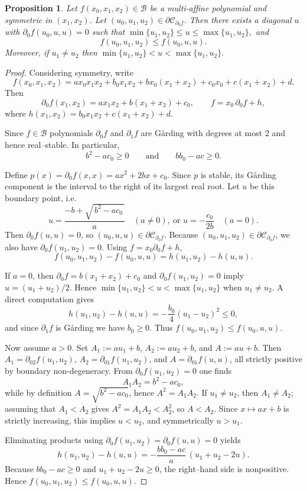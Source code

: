 \documentclass[10pt,a4paper]{amsart}
\providecommand{\propositionname}{Proposition}
\numberwithin{equation}{section}
\numberwithin{figure}{section}
\theoremstyle{plain}
\theoremstyle{remark}
\theoremstyle{definition}
\theoremstyle{plain}
\theoremstyle{definition}
\theoremstyle{plain}
\theoremstyle{plain}
\newtheorem{prop}[thm]{\protect\propositionname}
\theoremstyle{plain}
\providecommand{\propositionname}{Proposition}
\providecommand{\propositionname}{Proposition}
\begin{document}
\setcounter{section}{8}
\setcounter{thm}{9}
\begin{prop}
\label{prop:n=00003D2}Let $f(x_{0},x_{1},x_{2})\in\mathcal{B}$ be
a multi-affine polynomial and symmetric in $(x_{1},x_{2})$. Let $(u_{0},u_{1},u_{2})\in\partial\mathcal{C}_{\partial_{0}f}$.
Then there exists a diagonal $u$ with $\partial_{0}f(u_{0},u,u)=0$
such that $\min\{u_{1},u_{2}\}\le u\le\max\{u_{1},u_{2}\},$ and 
\[
f(u_{0},u_{1},u_{2})\le f(u_{0},u,u).
\]
Moreover, if $u_{1}\neq u_{2}$ then $\min\{u_{1},u_{2}\}<u<\max\{u_{1},u_{2}\}.$
\end{prop}

\begin{proof}
Considering symmetry, write
\[
f(x_{0},x_{1},x_{2})=ax_{0}x_{1}x_{2}+b_{0}x_{1}x_{2}+bx_{0}(x_{1}+x_{2})+c_{0}x_{0}+c(x_{1}+x_{2})+d.
\]
Then 
\[
\partial_{0}f(x_{1},x_{2})=ax_{1}x_{2}+b(x_{1}+x_{2})+c_{0},\qquad f=x_{0}\,\partial_{0}f+h,
\]
where $h(x_{1},x_{2})=b_{0}x_{1}x_{2}+c(x_{1}+x_{2})+d$.

Since $f\in\mathcal{B}$ polynomials $\partial_{0}f$ and $\partial_{1}f$
are G\aa rding with degrees at most 2 and hence real--stable. In
particular, 
\[
b^{2}-ac_{0}\ge0\qquad\text{and}\qquad bb_{0}-ac\ge0.
\]

Define $p(x)=\partial_{0}f(x,x)=ax^{2}+2bx+c_{0}$. Since $p$ is
stable, its G\aa rding component is the interval to the right of
its largest real root. Let $u$ be this boundary point, i.e. 
\[
u=\frac{-b+\sqrt{\,b^{2}-ac_{0}\,}}{a}\quad(a\ne0),\ \text{or }u=-\frac{c_{0}}{2b}\quad(a=0).
\]
Then $\partial_{0}f(u,u)=0$, so $(u_{0},u,u)\in\partial\mathcal{C}_{\partial_{0}f}$.
Because $(u_{0},u_{1},u_{2})\in\partial\mathcal{C}_{\partial_{0}f}$,
we also have $\partial_{0}f(u_{1},u_{2})=0$. Using $f=x_{0}\partial_{0}f+h$,
\[
f(u_{0},u_{1},u_{2})-f(u_{0},u,u)=h(u_{1},u_{2})-h(u,u).
\]

If $a=0$, then $\partial_{0}f=b(x_{1}+x_{2})+c_{0}$ and $\partial_{0}f(u_{1},u_{2})=0$
imply  $u=(u_{1}+u_{2})/2$. Hence $\min\{u_{1},u_{2}\}<u<\max\{u_{1},u_{2}\}$
when $u_{1}\ne u_{2}$. A direct computation gives 
\[
h(u_{1},u_{2})-h(u,u)=-\frac{b_{0}}{4}(u_{1}-u_{2})^{2}\le0,
\]
and since $\partial_{1}f$ is G\aa rding we have $b_{0}\ge0$. Thus
$f(u_{0},u_{1},u_{2})\le f(u_{0},u,u)$.

Now assume $a>0$. Set $A_{1}:=au_{1}+b$, $A_{2}:=au_{2}+b$, and
$A:=au+b$. Then $A_{1}=\partial_{02}f(u_{1},u_{2})$, $A_{2}=\partial_{01}f(u_{1},u_{2})$,
and $A=\partial_{01}f(u,u)$, all strictly positive by boundary non-degeneracy.
From $\partial_{0}f(u_{1},u_{2})=0$ one finds 
\[
A_{1}A_{2}=b^{2}-ac_{0},
\]
while by definition $A=\sqrt{b^{2}-ac_{0}}$, hence $A^{2}=A_{1}A_{2}$.
If $u_{1}\ne u_{2}$, then $A_{1}\ne A_{2}$; assuming that $A_{1}<A_{2}$
gives $A^{2}=A_{1}A_{2}<A_{2}^{2}$, so $A<A_{2}$. Since $x\mapsto ax+b$
is strictly increasing, this implies $u<u_{2}$, and symmetrically
$u>u_{1}$.

Eliminating products using $\partial_{0}f(u_{1},u_{2})=\partial_{0}f(u,u)=0$
yields 
\[
h(u_{1},u_{2})-h(u,u)=-\frac{bb_{0}-ac}{a}\,(u_{1}+u_{2}-2u).
\]
Because $bb_{0}-ac\ge0$ and $u_{1}+u_{2}-2u\ge0$, the right--hand
side is nonpositive. Hence $f(u_{0},u_{1},u_{2})\le f(u_{0},u,u)$. 
\end{proof}
\end{document}
